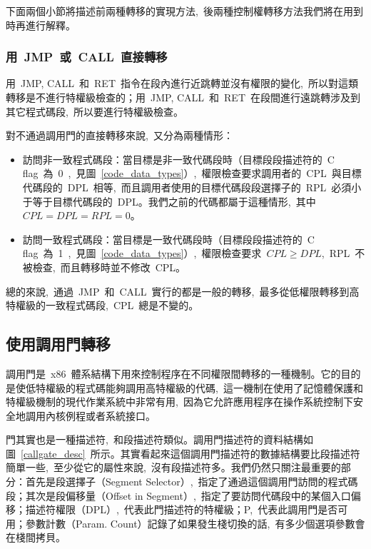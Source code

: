 下面兩個小節將描述前兩種轉移的實現方法,~後兩種控制權轉移方法我們將在用到時再進行解釋。

\subsubsection{用~JMP~或~CALL~直接轉移}

用~JMP, CALL~和~RET~指令在段內進行近跳轉並沒有權限的變化,~所以對這類轉移是不進行特權級檢查的；用~JMP, CALL~和~RET~在段間進行遠跳轉涉及到其它程式碼段,~所以要進行特權級檢查。

對不通過調用門的直接轉移來說,~又分為兩種情形：

\begin{itemize}
\item{訪問非一致程式碼段}：當目標是非一致代碼段時（目標段段描述符的~C flag~為~0~,~見圖~\ref{code_data_types}）,~權限檢查要求調用者的~CPL~與目標代碼段的~DPL~相等,~而且調用者使用的目標代碼段段選擇子的~RPL~必須小于等于目標代碼段的~DPL。我們之前的代碼都屬于這種情形,~其中~$CPL=DPL=RPL=0$。
\item{訪問一致程式碼段}：當目標是一致代碼段時（目標段段描述符的~C flag~為~1~,~見圖~\ref{code_data_types}）,~權限檢查要求~$CPL \ge DPL$,~RPL~不被檢查,~而且轉移時並不修改~CPL。
\end{itemize}

總的來說,~通過~JMP~和~CALL~實行的都是一般的轉移,~最多從低權限轉移到高特權級的一致程式碼段,~CPL~總是不變的。

\subsection{使用調用門轉移}\label{CHpm_callgate}

調用門是~x86~體系結構下用來控制程序在不同權限間轉移的一種機制。它的目的是使低特權級的程式碼能夠調用高特權級的代碼,~這一機制在使用了記憶體保護和特權級機制的現代作業系統中非常有用,~因為它允許應用程序在操作系統控制下安全地調用內核例程或者系統接口。


門其實也是一種描述符,~和段描述符類似。調用門描述符的資料結構如圖~\ref{callgate_desc}~所示。其實看起來這個調用門描述符的數據結構要比段描述符簡單一些,~至少從它的屬性來說,~沒有段描述符多。我們仍然只關注最重要的部分：首先是段選擇子（Segment Selector）,~指定了通過這個調用門訪問的程式碼段；其次是段偏移量（Offset in Segment）,~指定了要訪問代碼段中的某個入口偏移；描述符權限（DPL）,~代表此門描述符的特權級；P,~代表此調用門是否可用；參數計數（Param. Count）記錄了如果發生棧切換的話,~有多少個選項參數會在棧間拷貝。

